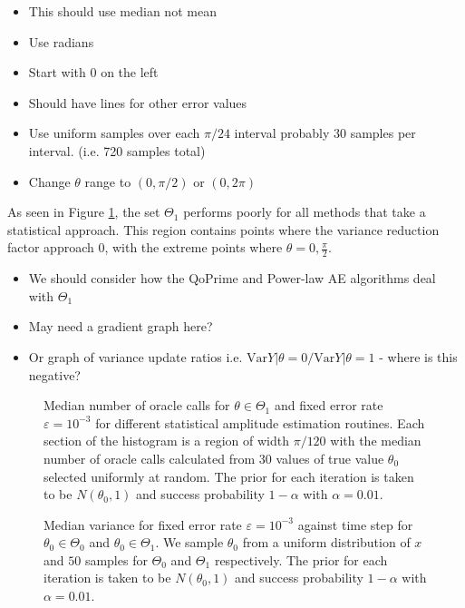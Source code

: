 \begin{itemize}
	\color{red}
	\item This should use median not mean
	\item Use radians
	\item Start with 0 on the left
	\item Should have lines for other error values
	\item Use uniform samples over each $\pi/24$ interval probably 30 samples per interval. (i.e. 720 samples total)
	\color{orange}
	\item Change $\theta$ range to $(0, \pi / 2)$ or $(0, 2 \pi)$
\end{itemize}

As seen in Figure \ref{fig::ExAE-converge-on-theta1}, the set $\Theta_1$ performs poorly for all methods that take a statistical approach. This region contains points where the variance reduction factor approach 0, with the extreme points where $\theta= 0, \frac{\pi}{2}$. 

\begin{itemize}
	\color{red}
	\item We should consider how the QoPrime and Power-law AE algorithms deal with $\Theta_1$
	\item May need a gradient graph here?
	\item Or graph of variance update ratios i.e. $\text{Var}{Y | \theta = 0} / \text{Var}{Y | \theta = 1}$ - where is this negative?
\end{itemize}


\begin{figure}[htb]
	\centering
	\caption{Median number of oracle calls for $\theta \in \Theta_1$ and fixed error rate $\varepsilon = 10^{-3}$ for different statistical amplitude estimation routines. Each section of the histogram is a region of width $\pi/120$ with the median number of oracle calls calculated from 30 values of true value $\theta_0$ selected uniformly at random. The prior for each iteration is taken to be $N(\theta_0, 1)$ and success probability $1 - \alpha$ with $\alpha = 0.01$.}
	\label{fig::ExAE-converge-on-theta1}
\end{figure}


\begin{figure}[htb]
	\centering
	\caption{Median variance for fixed error rate $\varepsilon = 10^{-3}$ against time step for $\theta_0 \in \Theta_0$ and $\theta_0 \in \Theta_1$. We sample $\theta_0$ from a uniform distribution of $x$ and $50$ samples for $\Theta_0$ and $ \Theta_1$ respectively. The prior for each iteration is taken to be $N(\theta_0, 1)$ and success probability $1 - \alpha$ with $\alpha = 0.01$.  }
	\label{fig::ExAE-var-per-step}
\end{figure}

